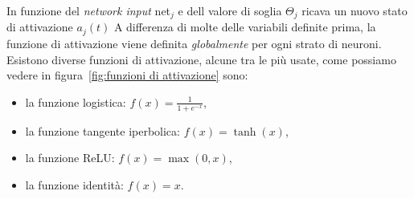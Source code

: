 \documentclass[12pt, twoside, letterpaper]{report}
\begin{document}
			 	In funzione del \textit{network input} net$_j$ e dell valore di soglia $\Theta_j$ ricava un nuovo stato di attivazione $a_j(t)$
			 	A differenza di molte delle variabili definite prima, la funzione di attivazione viene definita \textit{globalmente} per ogni strato di neuroni. Esistono diverse funzioni di attivazione, alcune tra le più usate, come possiamo vedere in figura~\ref{fig:funzioni di attivazione} sono: 
			 	\begin{itemize}
			 		\item la funzione logistica: $f(x) = \frac{1}{1+e^{-x}}$,
			 		\item la funzione tangente iperbolica: $f(x) = \tanh(x)$,
			 		\item la funzione ReLU: $f(x) = \max(0,x)$,
			 		\item la funzione identità: $f(x) = x$.
			 	\end{itemize}
\end{document}
